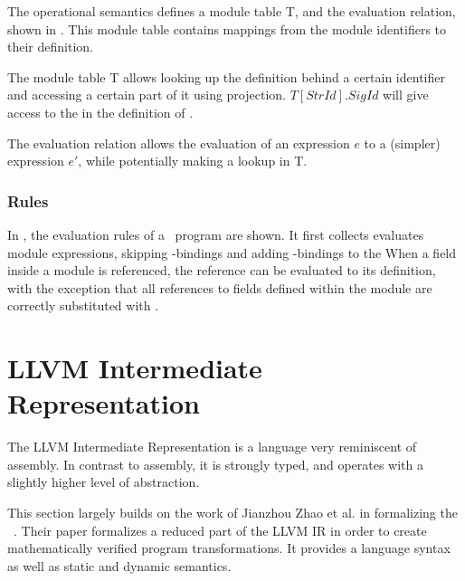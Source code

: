 The operational semantics defines a module table T, and the evaluation relation, shown in .
This module table contains mappings from the %
module identifiers to their definition. 

The module table T allows looking up the definition behind a certain identifier and accessing a certain part of it using projection. $T[\mathit{StrId}].\mathit{SigId}$ will give access to the  in the definition of . 

The evaluation relation allows the evaluation of an expression $e$ to a (simpler) expression $e'$, while potentially making a lookup in T.

\subsubsection{Rules}
In , the evaluation rules of a \MiniML\ program are shown.
It first collects evaluates module expressions, skipping -bindings and adding -bindings to the 
When a field inside a module is referenced, the reference can be evaluated to its definition, with the exception that all references to fields  defined within the module are correctly substituted with .




\clearpage
\section{LLVM Intermediate Representation}
The LLVM Intermediate Representation is a language very reminiscent of assembly.
In contrast to assembly, it is strongly typed, and operates with a slightly higher level of abstraction.

This section largely builds on the work of Jianzhou Zhao et al. in formalizing the \LLVMIR~\cite{Zhao:2012:FLI:2103656.2103709}.
Their paper formalizes a reduced part of the LLVM IR in order to create mathematically verified program transformations.
It provides a language syntax as well as static and dynamic semantics.


